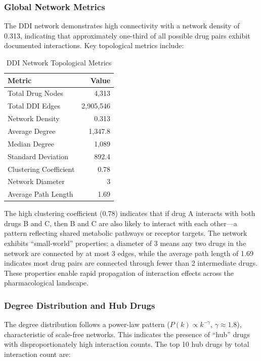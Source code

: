 \documentclass[11pt,a4paper]{article}
\begin{document}
\subsubsection*{Global Network Metrics}

The DDI network demonstrates high connectivity with a network density of 0.313, indicating that approximately one-third of all possible drug pairs exhibit documented interactions. Key topological metrics include:

\begin{table}[H]
\centering
\caption{DDI Network Topological Metrics}
\label{tab:network_metrics}
\begin{tabular}{lr}
\toprule
\textbf{Metric} & \textbf{Value} \\
\midrule
Total Drug Nodes & 4,313 \\
Total DDI Edges & 2,905,546 \\
Network Density & 0.313 \\
Average Degree & 1,347.8 \\
Median Degree & 1,089 \\
Standard Deviation & 892.4 \\
Clustering Coefficient & 0.78 \\
Network Diameter & 3 \\
Average Path Length & 1.69 \\
\bottomrule
\end{tabular}
\end{table}

The high clustering coefficient (0.78) indicates that if drug A interacts with both drugs B and C, then B and C are also likely to interact with each other---a pattern reflecting shared metabolic pathways or receptor targets. The network exhibits ``small-world'' properties: a diameter of 3 means any two drugs in the network are connected by at most 3 edges, while the average path length of 1.69 indicates most drug pairs are connected through fewer than 2 intermediate drugs. These properties enable rapid propagation of interaction effects across the pharmacological landscape.

\subsubsection*{Degree Distribution and Hub Drugs}

The degree distribution follows a power-law pattern ($P(k) \propto k^{-\gamma}$, $\gamma \approx 1.8$), characteristic of scale-free networks. This indicates the presence of ``hub'' drugs with disproportionately high interaction counts. The top 10 hub drugs by total interaction count are:
\end{document}
